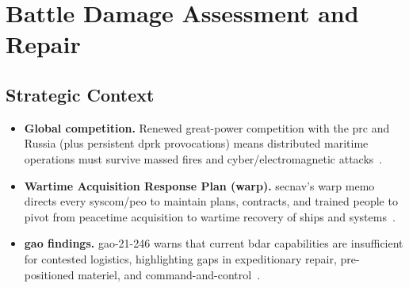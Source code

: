 \documentclass[../main.tex]{subfiles}
\begin{document}
\section{Battle Damage Assessment and Repair}

\subsection{Strategic Context}
\begin{itemize}
  \item \textbf{Global competition.} Renewed great-power competition with the \ac{prc} and Russia (plus persistent \ac{dprk} provocations) means distributed maritime operations must survive massed fires and cyber/electromagnetic attacks~\autocite{NAVPLAN2024,edo-4-1-6-bdar-2025}.
  \item \textbf{Wartime Acquisition Response Plan (\ac{warp}).} \ac{secnav}'s \ac{warp} memo directs every \ac{syscom}/\ac{peo} to maintain plans, contracts, and trained people to pivot from peacetime acquisition to wartime recovery of ships and systems~\autocite{SECNAV-WARP-2021}.
  \item \textbf{\ac{gao} findings.} \ac{gao}-21-246 warns that current \ac{bdar} capabilities are insufficient for contested logistics, highlighting gaps in expeditionary repair, pre-positioned materiel, and command-and-control~\autocite{GAO-21-246}.
\end{itemize}
\end{document}
